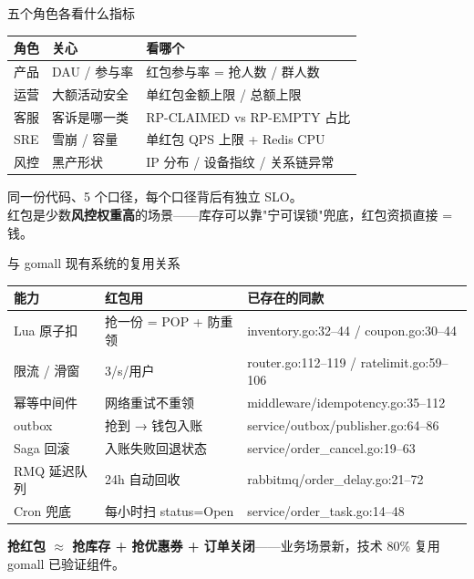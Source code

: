 \begin{frame}{五个角色各看什么指标}
\begin{tabular}{@{}lll@{}}
\toprule
角色 & 关心 & 看哪个 \\
\midrule
产品 & DAU / 参与率       & 红包参与率 = 抢人数 / 群人数 \\
运营 & 大额活动安全        & 单红包金额上限 / 总额上限 \\
客服 & 客诉是哪一类        & RP-CLAIMED vs RP-EMPTY 占比 \\
SRE  & 雪崩 / 容量         & 单红包 QPS 上限 + Redis CPU \\
风控 & 黑产形状            & IP 分布 / 设备指纹 / 关系链异常 \\
\bottomrule
\end{tabular}
\vspace{2mm}
\small 同一份代码、5 个口径，每个口径背后有独立 SLO。\\
红包是少数\textbf{风控权重高}的场景——库存可以靠"宁可误锁"兜底，红包资损直接 = 钱。
\end{frame}

\begin{frame}{与 gomall 现有系统的复用关系}
\begin{tabular}{@{}lll@{}}
\toprule
能力 & 红包用 & 已存在的同款 \\
\midrule
Lua 原子扣        & 抢一份 = POP + 防重领 & inventory.go:32--44 / coupon.go:30--44 \\
限流 / 滑窗      & 3/s/用户 & router.go:112--119 / ratelimit.go:59--106 \\
幂等中间件       & 网络重试不重领 & middleware/idempotency.go:35--112 \\
outbox          & 抢到 → 钱包入账 & service/outbox/publisher.go:64--86 \\
Saga 回滚        & 入账失败回退状态 & service/order\_cancel.go:19--63 \\
RMQ 延迟队列     & 24h 自动回收 & rabbitmq/order\_delay.go:21--72 \\
Cron 兜底       & 每小时扫 status=Open & service/order\_task.go:14--48 \\
\bottomrule
\end{tabular}
\vspace{1mm}
\small \textbf{抢红包 $\approx$ 抢库存 + 抢优惠券 + 订单关闭}——业务场景新，技术 80\% 复用 gomall 已验证组件。
\end{frame}

